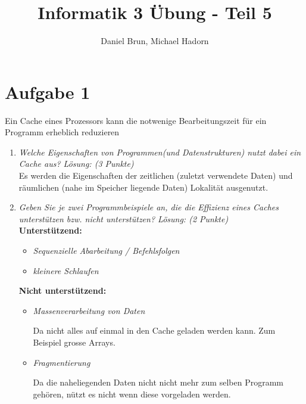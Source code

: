 \documentclass[10pt]{article}
\title{Informatik 3 Übung - Teil 5\vspace{-2ex}}
\author{Daniel Brun, Michael Hadorn\vspace{-2ex}}
\begin{document}
\maketitle

\section*{Aufgabe 1}
Ein Cache eines Prozessors kann die notwenige Bearbeitungszeit für ein Programm erheblich reduzieren
\begin{enumerate}[label=\alph*)]
	\item
		\textit{Welche Eigenschaften von Programmen(und Datenstrukturen) nutzt dabei ein Cache aus? Lösung: (3 Punkte)}\\
		Es werden die Eigenschaften der zeitlichen (zuletzt verwendete Daten) und räumlichen (nahe im Speicher liegende Daten) Lokalität ausgenutzt.
		
		\item 
		\textit{Geben Sie je zwei Programmbeispiele an, die die Effizienz eines Caches unterstützen bzw. nicht unterstützen? Lösung: (2 Punkte)}\\
		\textbf{Unterstützend:}
		\begin{itemize}
			\item \textit{Sequenzielle Abarbeitung / Befehlsfolgen }
			\item \textit{kleinere Schlaufen}
		\end{itemize}
		
		\textbf{Nicht unterstützend:}
		\begin{itemize}
			\item \textit{Massenverarbeitung von Daten}
			
			Da nicht alles auf einmal in den Cache geladen werden kann. Zum Beispiel grosse Arrays.
			
			\item \textit{Fragmentierung}
			
			
			Da die naheliegenden Daten nicht nicht mehr zum selben Programm gehören, nützt es nicht wenn diese vorgeladen werden.
			
		\end{itemize}
\end{enumerate}
\end{document}
